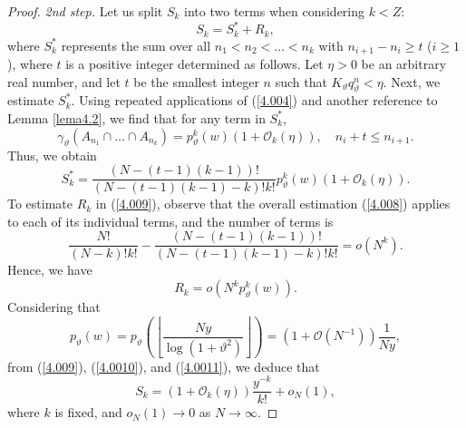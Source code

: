 \documentclass[final,1p,times]{elsarticle}
\numberwithin{equation}{section}
\begin{document}
\begin{proof}
\textit{2nd step.} Let us split \( S_k \) into two terms when considering \( k < Z \):
\begin{equation} \label{4.009}
S_k = S_k^* + R_k,
\end{equation}
where \( S_k^* \) represents the sum over all \( n_1 < n_2 < \ldots < n_k \) with \( n_{i+1} - n_i \geq t \) (\( i \geq 1 \)), where \( t \) is a positive integer determined as follows. Let \( \eta > 0 \) be an arbitrary real number, and let \( t \) be the smallest integer \( n \) such that \( K_{\vartheta} q_{\vartheta}^n < \eta \). Next, we estimate \( S_k^* \). Using repeated applications of (\ref{4.004}) and another reference to Lemma \ref{lema4.2}, we find that for any term in \( S_k^* \),
\[
\gamma_{\vartheta} \left( A_{n_1} \cap \ldots \cap A_{n_k} \right) = p_{\vartheta}^k(w) \left( 1 + \mathcal{O}_k(\eta) \right), \quad n_i + t \leq n_{i+1}.
\]
Thus, we obtain
\begin{equation} \label{4.0010} 
S_k^* = \frac{(N-(t-1)(k-1))!}{(N-(t-1)(k-1)-k)!k!} p_{\vartheta}^k(w) \left( 1 + \mathcal{O}_k(\eta) \right).
\end{equation}
To estimate \( R_k \) in (\ref{4.009}), observe that the overall estimation (\ref{4.008}) applies to each of its individual terms, and the number of terms is
\[
\frac{N!}{(N-k)!k!} - \frac{(N-(t-1)(k-1))!}{(N-(t-1)(k-1)-k)!k!} = o(N^k).
\]
Hence, we have
\begin{equation} \label{4.0011} 
R_k = o(N^k p_{\vartheta}^k(w)).
\end{equation}
Considering that
\[
p_{\vartheta}(w) = p_{\vartheta} \left( \left\lfloor \frac{N y}{\log(1+\vartheta^2)} \right\rfloor \right) = \left( 1 + \mathcal{O}(N^{-1}) \right) \frac{1}{Ny},
\]
from (\ref{4.009}), (\ref{4.0010}), and (\ref{4.0011}), we deduce that
\begin{equation} \label{4.0130}
S_k = \left( 1 + \mathcal{O}_k(\eta) \right) \frac{y^{-k}}{k!} + o_N(1),
\end{equation}
where \( k \) is fixed, and \( o_N(1) \to 0 \) as \( N \to \infty \).


\end{proof}
\end{document}
